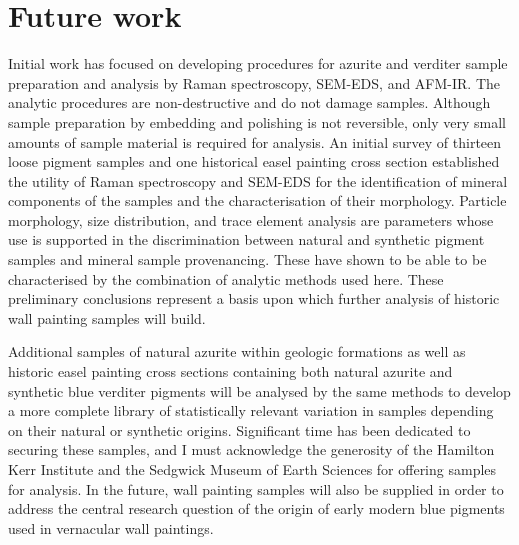 
\chapter{Future work} %

Initial work has focused on developing procedures for azurite and verditer sample preparation and analysis by Raman spectroscopy, SEM-EDS, and AFM-IR. The analytic procedures are non-destructive and do not damage samples. Although sample preparation by embedding and polishing is not reversible, only very small amounts of sample material is required for analysis. An initial survey of thirteen loose pigment samples and one historical easel painting cross section established the utility of Raman spectroscopy and SEM-EDS for the identification of mineral components of the samples and the characterisation of their morphology. Particle morphology, size distribution, and trace element analysis are parameters whose use is supported in the discrimination between natural and synthetic pigment samples and mineral sample provenancing. These have shown to be able to be characterised by the combination of analytic methods used here. These preliminary conclusions represent a basis upon which further analysis of historic wall painting samples will build.

Additional samples of natural azurite within geologic formations as well as historic easel painting cross sections containing both natural azurite and synthetic blue verditer pigments will be analysed by the same methods to develop a more complete library of statistically relevant variation in samples depending on their natural or synthetic origins. Significant time has been dedicated to securing these samples, and I must acknowledge the generosity of the Hamilton Kerr Institute and the Sedgwick Museum of Earth Sciences for offering samples for analysis. In the future, wall painting samples will also be supplied in order to address the central research question of the origin of early modern blue pigments used in vernacular wall paintings. 

